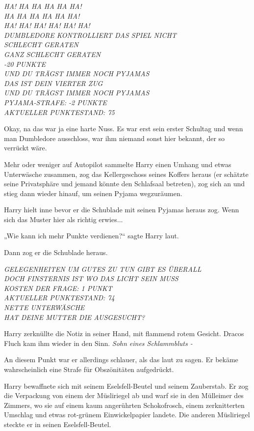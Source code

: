 {\emph{HA! HA HA HA HA HA!\\ HA HA HA HA HA HA!\\ HA! HA! HA! HA! HA! HA!\\ DUMBLEDORE KONTROLLIERT DAS SPIEL NICHT\\ SCHLECHT GERATEN\\ GANZ SCHLECHT GERATEN\\ -20 PUNKTE\\ UND DU TRÄGST IMMER NOCH PYJAMAS\\ DAS IST DEIN VIERTER ZUG\\ UND DU TRÄGST IMMER NOCH PYJAMAS\\ PYJAMA-STRAFE: -2 PUNKTE\\ AKTUELLER PUNKTESTAND: 75}

Okay, na das war ja eine harte Nuss. Es war erst sein erster Schultag und wenn man Dumbledore ausschloss, war ihm niemand sonst hier bekannt, der so verrückt wäre.

Mehr oder weniger auf Autopilot sammelte Harry einen Umhang und etwas Unterwäsche zusammen, zog das Kellergeschoss seines Koffers heraus (er schätzte seine Privatsphäre und jemand könnte den Schlafsaal betreten), zog sich an und stieg dann wieder hinauf, um seinen Pyjama wegzuräumen.

Harry hielt inne bevor er die Schublade mit seinen Pyjamas heraus zog. Wenn sich das Muster hier als richtig erwies...

„Wie kann ich mehr Punkte verdienen?“ sagte Harry laut.

Dann zog er die Schublade heraus.

\emph{GELEGENHEITEN UM GUTES ZU TUN GIBT ES ÜBERALL\\ DOCH FINSTERNIS IST WO DAS LICHT SEIN MUSS\\ KOSTEN DER FRAGE: 1 PUNKT\\ AKTUELLER PUNKTESTAND: 74\\ NETTE UNTERWÄSCHE\\ HAT DEINE MUTTER DIE AUSGESUCHT?}

Harry zerknüllte die Notiz in seiner Hand, mit flammend rotem Gesicht. Dracos Fluch kam ihm wieder in den Sinn. \emph{Sohn eines Schlammbluts -}

An diesem Punkt war er allerdings schlauer, als das laut zu sagen. Er bekäme wahrscheinlich eine Strafe für Obszönitäten aufgedrückt.

Harry bewaffnete sich mit seinem Eselsfell-Beutel und seinem Zauberstab. Er zog die Verpackung von einem der Müsliriegel ab und warf sie in den Mülleimer des Zimmers, wo sie auf einem kaum angerührten Schokofrosch, einem zerknitterten Umschlag und etwas rot-grünem Einwickelpapier landete. Die anderen Müsliriegel steckte er in seinen Eselsfell-Beutel.

}

